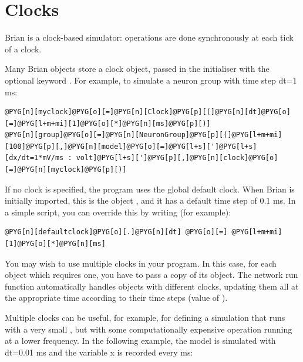 \documentclass[letterpaper,10pt,english]{manual}
\begin{document}
\resetcurrentobjects
\hypertarget{--doc-clocks}{}

\hypertarget{index-2}{}\section{Clocks}

Brian is a clock-based simulator: operations are done synchronously at each tick of a clock.

Many Brian objects store a clock object, passed in the initialiser with the optional keyword .
For example, to simulate a neuron group with time step dt=1 ms:

\begin{Verbatim}[commandchars=@\[\]]
@PYG[n][myclock]@PYG[o][=]@PYG[n][Clock]@PYG[p][(]@PYG[n][dt]@PYG[o][=]@PYG[l+m+mi][1]@PYG[o][*]@PYG[n][ms]@PYG[p][)]
@PYG[n][group]@PYG[o][=]@PYG[n][NeuronGroup]@PYG[p][(]@PYG[l+m+mi][100]@PYG[p][,]@PYG[n][model]@PYG[o][=]@PYG[l+s][']@PYG[l+s][dx/dt=1*mV/ms : volt]@PYG[l+s][']@PYG[p][,]@PYG[n][clock]@PYG[o][=]@PYG[n][myclock]@PYG[p][)]
\end{Verbatim}

If no clock is specified, the program uses the global default clock. When Brian is initially
imported, this is the object \hyperlink{brian.defaultclock}{}, and it has a default
time step of 0.1 ms. In a simple script, you can override this by writing (for example):

\begin{Verbatim}[commandchars=@\[\]]
@PYG[n][defaultclock]@PYG[o][.]@PYG[n][dt] @PYG[o][=] @PYG[l+m+mi][1]@PYG[o][*]@PYG[n][ms]
\end{Verbatim}

You may wish to use multiple clocks in your program. In this case,
for each object which requires one, you have to pass a copy of its
\hyperlink{brian.Clock}{} object. The network run function automatically handles objects
with different clocks, updating them all at the appropriate time
according to their time steps (value of \hyperlink{brian.Clock.dt}{}).

Multiple clocks can be useful, for example, for defining a simulation
that runs with a very small , but with some computationally
expensive operation running at a lower frequency. In the following example, the model
is simulated with dt=0.01 ms and the variable x is recorded every ms:
\end{document}
